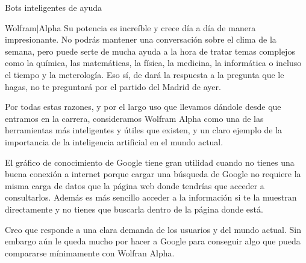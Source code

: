 \documentclass[spanish, a4paper, 12pt]{article} 	%
\begin{document}
\begin{section}{Bots inteligentes de ayuda}
\begin{itemize}
\begin{section}{Wolfram$\vert$Alpha}
	  Su potencia es increíble y crece día a día de manera impresionante. No podrás mantener una conversación sobre el clima de la semana, pero puede serte de mucha ayuda a la hora de tratar temas complejos como la química, las matemáticas, la física, la medicina, la informática o incluso el tiempo y la meterología. Eso sí, de dará la respuesta a la pregunta que le hagas, no te preguntará por el partido del Madrid de ayer.
	
	Por todas estas razones, y por el largo uso que llevamos dándole desde que entramos en la carrera, consideramos Wolfram Alpha como una de las herramientas  más inteligentes y útiles que existen, y un claro ejemplo de la importancia de la inteligencia artificial en el mundo actual.
	
	El gráfico de conocimiento de Google tiene gran utilidad cuando no tienes una buena conexión a internet porque cargar una búsqueda de Google no requiere la misma carga de datos que la página web donde tendrías que acceder a consultarlos. Además es más sencillo acceder a la información si te la muestran directamente y no tienes que buscarla dentro de la página donde está. 
	
	Creo que responde a una clara demanda de los usuarios y del mundo actual. Sin embargo aún le queda mucho por hacer a Google para conseguir algo que pueda compararse mínimamente con Wolfran Alpha.
	
	
\end{section}
	
	\end{itemize}
\end{section}
\end{document}
